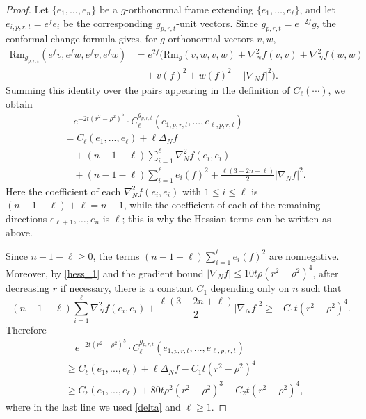 \documentclass[11pt]{amsart}
\theoremstyle{definition}
\theoremstyle{remark}
\numberwithin{equation}{section}
\begin{document}
    \begin{proof}
        Let $\{e_1,\ldots,e_n\}$ be a $g$-orthonormal frame extending
          $\{e_1,\ldots,e_\ell\}$, and let
          $e_{i,p,r,t}=e^{f}e_i$ be the corresponding $g_{p,r,t}$-unit vectors. Since
          $g_{p,r,t}=e^{-2f}g$, the conformal change formula gives, for $g$-orthonormal vectors
          $v,w$,
        \[
            \begin{aligned}
            \text{Rm}_{g_{p,r,t}}(e^fv,e^fw,e^fv,e^fw)
            &=e^{2f}\Big(\text{Rm}_{g}(v,w,v,w)+\nabla^{2}_{N}f(v,v)
              +\nabla^{2}_{N}f(w,w)\\
            &\quad +v(f)^2+w(f)^2-|\nabla_{N}f|^2\Big).
            \end{aligned}
        \]
        Summing this identity over the pairs appearing in the definition of $C_\ell(\cdots)$, we obtain
        \[
        \begin{aligned}
            &\quad e^{-2t(r^2-\rho^2)^{5}}\cdot
              C_{\ell}^{g_{p,r,t}}(e_{1,p,r,t},...,e_{\ell,p,r,t})\\
            &=C_{\ell}(e_{1},...,e_{\ell})+\ell\Delta_{N}f\\
            &\quad
              +(n-1-\ell)\sum_{i=1}^{\ell}\nabla_N^2f(e_i,e_i)\\
            &\quad
              +(n-1-\ell)\sum_{i=1}^{\ell}e_i(f)^2
              +\frac{\ell(3-2n+\ell)}{2}|\nabla_N f|^2.
        \end{aligned}
        \]
        Here the coefficient of each $\nabla_N^2f(e_i,e_i)$ with $1\leq i\leq \ell$ is
          $(n-1-\ell)+\ell=n-1$, while the coefficient of each of the remaining directions
          $e_{\ell+1},\ldots,e_n$ is $\ell$; this is why the Hessian terms can be written as above.

        Since $n-1-\ell\geq0$, the terms
          $(n-1-\ell)\sum_{i=1}^{\ell}e_i(f)^2$ are nonnegative. Moreover, by \eqref{hess_1} and
          the gradient bound $|\nabla_N f|\leq 10t\rho(r^2-\rho^2)^4$, after decreasing $r$ if
          necessary, there is a constant $C_1$ depending only on $n$ such that
        \[
            (n-1-\ell)\sum_{i=1}^{\ell}\nabla_N^2f(e_i,e_i)
            +\frac{\ell(3-2n+\ell)}{2}|\nabla_N f|^2
            \geq -C_1t(r^2-\rho^2)^4.
        \]
        Therefore
        \[
        \begin{aligned}
            &\quad e^{-2t(r^2-\rho^2)^{5}}\cdot
              C_{\ell}^{g_{p,r,t}}(e_{1,p,r,t},...,e_{\ell,p,r,t})\\
            &\geq C_{\ell}(e_{1},...,e_{\ell})+\ell\Delta_N f-C_{1}t(r^2-\rho^2)^{4}\\
            &\geq C_{\ell}(e_{1},...,e_{\ell})+80t\rho^2(r^2-\rho^2)^{3}
              -C_{2}t(r^2-\rho^2)^{4},
        \end{aligned}
        \]
        where in the last line we used \eqref{delta} and $\ell\geq1$.


\end{proof}
\end{document}
